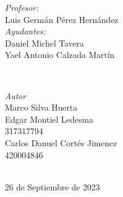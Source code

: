 \begin{titlepage}
    \vspace{10mm}
    \begin{minipage}{0.7\textwidth}
        \begin{flushleft} \large
            \emph{Profesor:}\\
                Luis Germán Pérez Hernández\\
                \vspace{3mm}
                \emph{Ayudantes:}\\
                Daniel Michel Tavera\\
                Yael Antonio Calzada Martín\\
        \end{flushleft}
    \end{minipage}
    \\
    \vspace{20mm}
    \begin{minipage}{0.4\textwidth}
        \begin{flushright} \large
        \centering
            \emph{Autor} \\ %
            \vspace{3mm}
            Marco Silva Huerta\\
            \vspace{4mm}
            Edgar Montiel Ledesma\\
            317317794\\
            \vspace{4mm}
            Carlos Danuel Cortés Jimenez\\
            420004846\\ 
        \end{flushright}
    \end{minipage}\\[2.6cm]
    \makeatother
    {\large 26 de Septiembre de 2023}\\[2cm]
    \vfill 
    \end{titlepage}